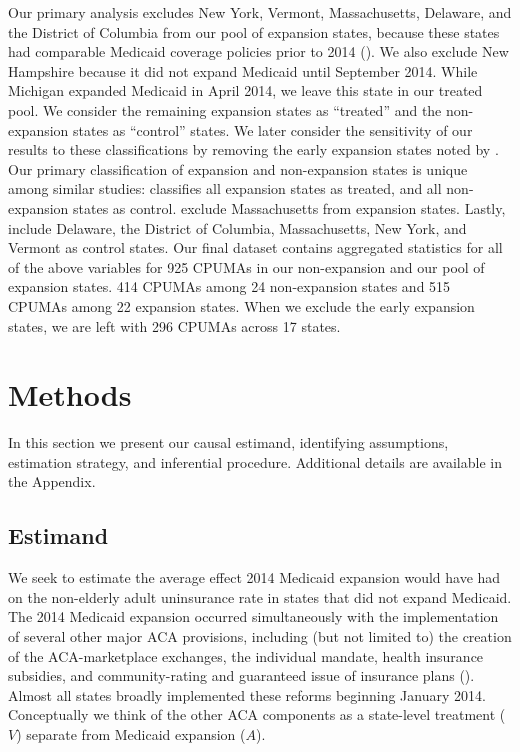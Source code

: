 \documentclass[12pt]{article}
\begin{document}
Our primary analysis excludes New York, Vermont, Massachusetts, Delaware, and the District of Columbia from our pool of expansion states, because these states had comparable Medicaid coverage policies prior to 2014 (\cite{kaestner2017effects}). We also exclude New Hampshire because it did not expand Medicaid until September 2014. While Michigan expanded Medicaid in April 2014, we leave this state in our treated pool. We consider the remaining expansion states as ``treated'' and the non-expansion states as ``control'' states. We later consider the sensitivity of our results to these classifications by removing the early expansion states noted by \cite{frean2017premium}. Our primary classification of expansion and non-expansion states is unique among similar studies: \cite{courtemanche2017early} classifies all expansion states as treated, and all non-expansion states as control. \cite{frean2017premium} exclude Massachusetts from expansion states. Lastly, \cite{kaestner2017effects} include Delaware, the District of Columbia, Massachusetts, New York, and Vermont as control states. Our final dataset contains aggregated statistics for all of the above variables for 925 CPUMAs in our non-expansion and our pool of expansion states. 414 CPUMAs among 24 non-expansion states and 515 CPUMAs among 22 expansion states. When we exclude the early expansion states, we are left with 296 CPUMAs across 17 states.

\section{Methods}
\label{sec:methods}

In this section we present our causal estimand, identifying assumptions, estimation strategy, and inferential procedure. Additional details are available in the Appendix.

\subsection{Estimand}

We seek to estimate the average effect 2014 Medicaid expansion would have had on the non-elderly adult uninsurance rate in states that did not expand Medicaid. The 2014 Medicaid expansion occurred simultaneously with the implementation of several other major ACA provisions, including (but not limited to) the creation of the ACA-marketplace exchanges, the individual mandate, health insurance subsidies, and community-rating and guaranteed issue of insurance plans (\cite{courtemanche2017early}). Almost all states broadly implemented these reforms beginning January 2014. Conceptually we think of the other ACA components as a state-level treatment ($V$) separate from Medicaid expansion ($A$).
\end{document}
